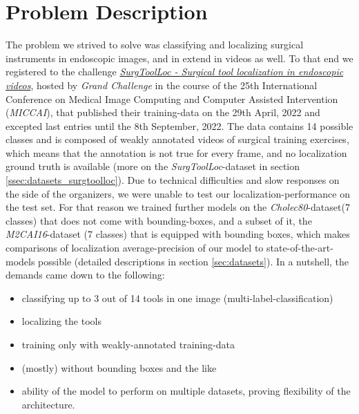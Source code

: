 \section{Problem Description}
The problem we strived to solve was classifying and localizing surgical instruments in endoscopic images, and in extend in videos as well. 
To that end we registered to the challenge \href{https://surgtoolloc.grand-challenge.org}{\emph{SurgToolLoc - Surgical tool localization in endoscopic videos}}, hosted by \emph{Grand Challenge} in the course of the 25th International Conference on Medical Image Computing and Computer Assisted Intervention (\emph{MICCAI}), that published their training-data on the 29th April, 2022 and excepted last entries until the 8th September, 2022. The data contains 14 possible classes and is composed of weakly annotated videos of surgical training exercises, which means that the annotation is not true for every frame, and no localization ground truth is available (more on the \emph{SurgToolLoc}-dataset in section \ref{ssec:datasets_surgtoolloc}). Due to technical difficulties and slow responses on the side of the organizers, we were unable to test our localization-performance on the test set. For that reason we trained further models on the \textit{Cholec80}-dataset(7 classes) that does not come with bounding-boxes, and a subset of it, the \textit{M2CAI16}-dataset (7 classes) that is equipped with bounding boxes, which makes comparisons of localization average-precision of our model to state-of-the-art-models possible (detailed descriptions in section \ref{sec:datasets}).
In a nutshell, the demands came down to the following:
\begin{itemize}
	\item classifying up to 3 out of 14 tools in one image (multi-label-classification)
	\item localizing the tools
	\item training only with weakly-annotated training-data
	\item (mostly) without bounding boxes and the like
	\item ability of the model to perform on multiple datasets, proving flexibility of the architecture.
\end{itemize}

